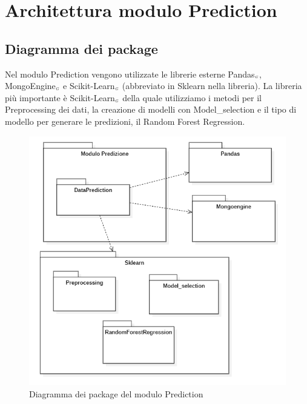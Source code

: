 \section{Architettura modulo Prediction}\label{ArchitetturaDelProdottoArchitetturaModuloPrediction}
\subsection{Diagramma dei package}\label{ArchitetturaDelProdottoArchitetturaModuloPredictionDiagrammaDeiPackage}
Nel modulo Prediction vengono utilizzate le librerie esterne Pandas$_{\scaleto{G}{3pt}}$, MongoEngine$_{\scaleto{G}{3pt}}$ e Scikit-Learn$_{\scaleto{G}{3pt}}$ (abbreviato in Sklearn nella libreria). La libreria più importante è Scikit-Learn$_{\scaleto{G}{3pt}}$ della quale utilizziamo i metodi per il Preprocessing dei dati, la creazione di modelli con Model\_selection e il tipo di modello per generare le predizioni, il Random Forest Regression.
\begin{figure}[H]
  \begin{center}
    \includegraphics[scale=0.8]{../immagini/diag_PB/diag_pack_pred.png}
    \caption{Diagramma dei package del modulo Prediction}
  \end{center}
\end{figure}

